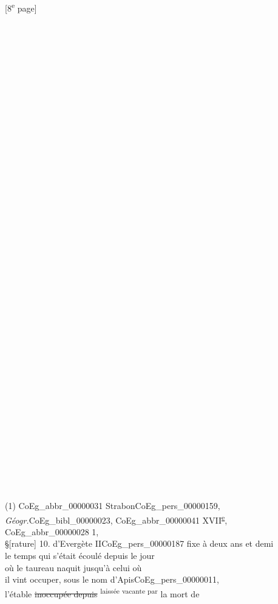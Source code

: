 \documentclass{book}
\begin{document}
{{\footnotesize\begin{center} {[8\textsuperscript{e} page]}\end{center}}
\begin{paracol}{2}
\noindent \\
\\
\\
\\
\\
\\
\\
\\
\\
\\
\\
\\
\\
\\
\\
\\
\\
\\
\\
\\
\\
\\
\\
\\
\\
\\
\\
\\
\\
\\
\\
\\
\\
\\
\\
\\
\\
\\
\\
\\
(1) \Gls{CoEg_abbr_00000031} Strabon\gls{CoEg_pers_00000159}, \textit{Géogr.}\gls{CoEg_bibl_00000023}, \Gls{CoEg_abbr_00000041} XVII\textsuperscript{\underline{e}}, \gls{CoEg_abbr_00000028} 1,\\
\S [rature] 10.
\switchcolumn
\noindent d’Evergète II\gls{CoEg_pers_00000187} fixe à deux ans et demi\\
le temps qui s’était écoulé depuis le jour\\
où le taureau naquit jusqu’à celui où\\
il vint occuper, sous le nom d’Apis\gls{CoEg_pers_00000011},\\
l’étable \sout{inoccupée depuis} \textsuperscript{laissée vacante par} la mort de\\

\end{paracol}}
\end{document}
